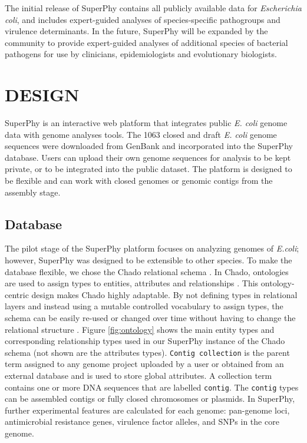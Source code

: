 \documentclass[a4paper,twoside]{article}
\begin{document}
The initial release of SuperPhy contains all publicly available data for \textit{Escherichia coli}, and includes expert-guided analyses of species-specific pathogroups and virulence determinants. In the future, SuperPhy will be expanded by the community to provide expert-guided analyses of additional species of bacterial pathogens for use by clinicians, epidemiologists and evolutionary biologists.

\section{\uppercase{Design}}
\label{sec:design}

\noindent SuperPhy is an interactive web platform that integrates public \textit{E. coli} genome data with genome analyses tools. The 1063 closed and draft \textit{E. coli} genome sequences were downloaded from GenBank and incorporated into the SuperPhy database. Users can upload their own genome sequences for analysis to be kept private, or to be integrated into the public dataset. The platform is designed to be flexible and can work with closed genomes or genomic contigs from the assembly stage. 

\subsection{Database}

The pilot stage of the SuperPhy platform focuses on analyzing genomes of \textit{E.coli}; however, SuperPhy was designed to be extensible to other species. To make the database flexible, we chose the Chado relational schema \cite{mungall2007chado}. In Chado, ontologies are used to assign types to entities, attributes and relationships \cite{mungall2007chado}. This ontology-centric design makes Chado highly adaptable. By not defining types in relational layers and instead using a mutable controlled vocabulary to assign types, the schema can be easily re-used or changed over time without having to change the relational structure \cite{mungall2007chado}.  Figure \ref{fig:ontology} shows the main entity types and corresponding relationship types used in our SuperPhy instance of the Chado schema (not shown are the attributes types). \texttt{Contig collection} is the parent term assigned to any genome project uploaded by a user or obtained from an external database and is used to store global attributes. A collection term contains one or more DNA sequences that are labelled \texttt{contig}. The \texttt{contig} types can be assembled contigs or fully closed chromosomes or plasmids. In SuperPhy, further experimental features are calculated for each genome: pan-genome loci, antimicrobial resistance genes, virulence factor alleles, and SNPs in the core genome. 
\end{document}
